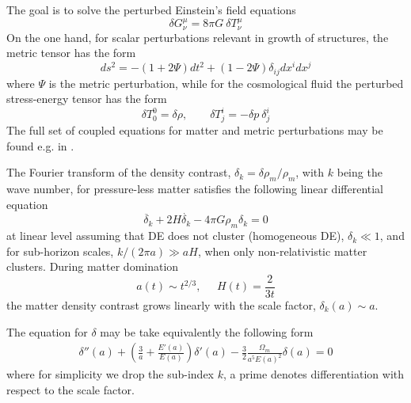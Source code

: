 \documentclass[aps,prd,amsmath,amssymb]{revtex4}
\begin{document}
The goal is to solve the perturbed Einstein's field equations
\begin{equation}
\delta G_\nu^\mu = 8 \pi G \: \delta T_\nu^\mu
\end{equation}
On the one hand, for scalar perturbations relevant in growth of structures, the metric tensor has the form
\begin{equation}
ds^2 = -(1 + 2 \Psi) dt^2 + (1-2 \Psi) \delta_{ij} dx^i dx^j
\end{equation}
where $\Psi$ is the metric perturbation, while for the cosmological fluid the perturbed stress-energy tensor has the form
\begin{equation}
\delta T_0^0 = \delta \rho, \qquad \delta T_j^i = - \delta p \: \delta_j^i
\end{equation}
The full set of coupled equations for matter and metric perturbations may be found e.g. in \cite{mariam,pano1,pano2}.

\smallskip

The Fourier transform of the density contrast, $\delta_k = \delta \rho_m / \rho_m$, with $k$ being the wave number,
for pressure-less matter satisfies the following linear differential equation \cite{rogerio,leandros2,review2}
\begin{equation}
\ddot{\delta_k} + 2H \dot{\delta_k} - 4 \pi G \rho_m \delta_k = 0
\end{equation}
at linear level assuming that DE does not cluster (homogeneous DE), $\delta_k \ll 1$, and for sub-horizon 
scales, $k/(2 \pi a) \gg a H$, when only non-relativistic matter clusters. During matter domination
\begin{equation}
a(t) \sim t^{2/3}, \; \; \; \; \; H(t) = \frac{2}{3 t}
\end{equation}
the matter density contrast  grows linearly with the scale factor, $\delta_k(a) \sim a$.

\smallskip

The equation for $\delta$ may be take equivalently the following form 
%
\begin{align}
\delta''(a) + \left( \frac{3}{a} + \frac{E'(a)}{E(a)} \right) \delta'(a) - \frac{3}{2} \frac{\Omega_m}{a^5 E(a)^2} \delta(a) = 0
\end{align}
%
where for simplicity we drop the sub-index $k$, a prime denotes differentiation with respect to the scale factor.

\smallskip
\end{document}
